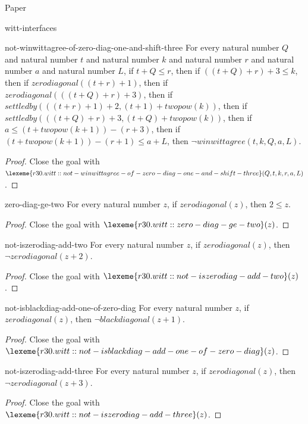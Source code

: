 \begin{lexlean}{Paper}
\begin{section}{witt-interfaces}
  \begin{theorem}{not-winwittagree-of-zero-diag-one-and-shift-three}
  For every natural number \(Q\) and natural number \(t\) and natural number \(k\) and natural number \(r\) and natural number \(a\) and natural number \(L\), if \(t + Q ≤ r\), then if \(((t + Q) + r) + 3 ≤ k\), then if \(zerodiagonal((t + r) + 1)\), then if \(zerodiagonal(((t + Q) + r) + 3)\), then if \(settledby(((t + r) + 1) + 2, (t + 1) + twopow(k))\), then if \(settledby(((t + Q) + r) + 3, (t + Q) + twopow(k))\), then if \(a ≤ (t + twopow(k + 1)) - (r + 3)\), then if \((t + twopow(k + 1)) - (r + 1) ≤ a + L\), then \(¬ winwittagree(t, k, Q, a, L)\).
  \begin{proof}
  Close the goal with \(\lexeme{r30.witt::not-winwittagree-of-zero-diag-one-and-shift-three}(Q, t, k, r, a, L)\).
  \end{proof}
  \end{theorem}

  \begin{theorem}{zero-diag-ge-two}
  For every natural number \(z\), if \(zerodiagonal(z)\), then \(2 ≤ z\).
  \begin{proof}
  Close the goal with \(\lexeme{r30.witt::zero-diag-ge-two}(z)\).
  \end{proof}
  \end{theorem}

  \begin{theorem}{not-iszerodiag-add-two}
  For every natural number \(z\), if \(zerodiagonal(z)\), then \(¬ zerodiagonal(z + 2)\).
  \begin{proof}
  Close the goal with \(\lexeme{r30.witt::not-iszerodiag-add-two}(z)\).
  \end{proof}
  \end{theorem}

  \begin{theorem}{not-isblackdiag-add-one-of-zero-diag}
  For every natural number \(z\), if \(zerodiagonal(z)\), then \(¬ blackdiagonal(z + 1)\).
  \begin{proof}
  Close the goal with \(\lexeme{r30.witt::not-isblackdiag-add-one-of-zero-diag}(z)\).
  \end{proof}
  \end{theorem}

  \begin{theorem}{not-iszerodiag-add-three}
  For every natural number \(z\), if \(zerodiagonal(z)\), then \(¬ zerodiagonal(z + 3)\).
  \begin{proof}
  Close the goal with \(\lexeme{r30.witt::not-iszerodiag-add-three}(z)\).
  \end{proof}
  \end{theorem}


\end{section}
\end{lexlean}

